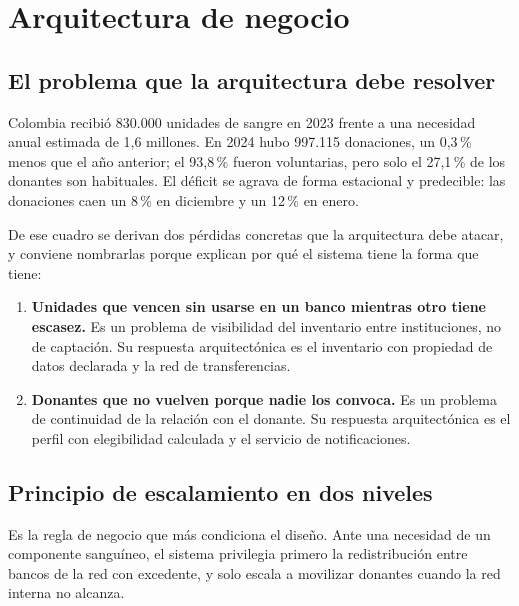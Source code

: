 \documentclass[11pt,a4paper]{article}
\begin{document}
\section{Arquitectura de negocio}
\label{sec:negocio}

\subsection{El problema que la arquitectura debe resolver}

Colombia recibió 830.000 unidades de sangre en 2023 frente a una necesidad anual estimada de 1,6 millones. En 2024 hubo 997.115 donaciones, un 0,3\,\% menos que el año anterior; el 93,8\,\% fueron voluntarias, pero solo el 27,1\,\% de los donantes son habituales. El déficit se agrava de forma estacional y predecible: las donaciones caen un 8\,\% en diciembre y un 12\,\% en enero.

De ese cuadro se derivan dos pérdidas concretas que la arquitectura debe atacar, y conviene nombrarlas porque explican por qué el sistema tiene la forma que tiene:

\begin{enumerate}
\item \textbf{Unidades que vencen sin usarse en un banco mientras otro tiene escasez.} Es un problema de visibilidad del inventario entre instituciones, no de captación. Su respuesta arquitectónica es el inventario con propiedad de datos declarada y la red de transferencias.
\item \textbf{Donantes que no vuelven porque nadie los convoca.} Es un problema de continuidad de la relación con el donante. Su respuesta arquitectónica es el perfil con elegibilidad calculada y el servicio de notificaciones.
\end{enumerate}

\subsection{Principio de escalamiento en dos niveles}

Es la regla de negocio que más condiciona el diseño. Ante una necesidad de un componente sanguíneo, el sistema privilegia primero la redistribución entre bancos de la red con excedente, y solo escala a movilizar donantes cuando la red interna no alcanza.
\end{document}
